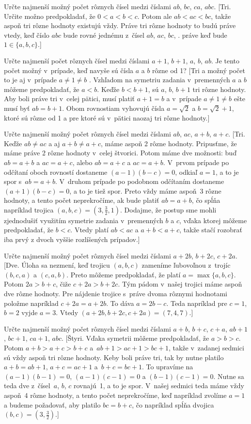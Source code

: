 {Určte najmenší možný počet rôznych čísel medzi
číslami $ab$, $bc$, $ca$, $abc$.
[Tri. Určite možno predpokladať, že
$0<a<b<c$. Potom ale $ab<ac<bc$, takže aspoň tri rôzne hodnoty
existujú vždy. Práve tri rôzne hodnoty to budú
práve vtedy, keď číslo $abc$ bude rovné jednému z~čísel $ab$, $ac$,
$bc$, \tj. práve keď bude $1\in\{a,b,c\}$.]

Určte najmenší počet rôznych čísel medzi číslami $a+1$, $b+1$,
$a$, $b$, $ab$. Je tento počet možný v~prípade, keď navyše
sú čísla $a$ a $b$ rôzne od 1?
[Tri a možný počet to je aj v~prípade $a\ne1\ne b$ .
Vzhľadom na symetriu zadania v~premenných $a$ a $b$ môžeme
predpokladať, že $a<b$. Keďže $b<b+1$, sú $a$, $b$, $b+1$
tri rôzne hodnoty. Aby boli práve tri v~celej pätici, musí platiť
$a+1=b$ a v~prípade $a\ne1\ne b$ ešte musí byť
$ab=b+1$. Obom rovnostiam vyhovujú čísla $a=\sqrt2$ a
$b=\sqrt2+1$, ktoré sú rôzne od 1 a pre ktoré sú v~pätici
naozaj tri rôzne hodnoty.]

Určte najmenší možný počet rôznych čísel medzi
číslami $ab$, $ac$, $a+b$, $a+c$.
[Tri. Keďže $ab \ne ac$ a aj $a+b\ne a+c$, máme aspoň 2
rôzne hodnoty. Pripusťme, že máme práve 2 rôzne hodnoty
v~celej štvorici. Potom máme dve možnosti: buď $ab=a+b$ a $ac=a+c$,
alebo $ab=a+c$ a $ac=a+b$. V~prvom prípade po odčítaní oboch rovností
dostaneme $(a-1)(b-c)=0$, odkiaľ $a=1$, a to je spor s~$ab=a+b$.
V~druhom prípade po podobnom odčítaním dostaneme $(a+1)(b-c)=0$,
a to je tiež spor. Preto vždy máme aspoň~3 rôzne hodnoty, a
tento počet neprekročíme, ak bude platiť $ab=a+b$, čo spĺňa
napríklad trojica $(a,b,c)=(3,\frac32,1)$. Dodajme, že postup
sme mohli zjednodušiť využitím symetrie zadania v~premenných
$b$ a $c$, vďaka ktorej môžeme predpokladať, že $b<c$. Vtedy platí
$ab<ac$ a $a+b<a+c$, takže stačí rozobrať iba prvý z dvoch vyššie
rozlíšených prípadov.]

\D
Určte najmenší možný počet rôznych čísel medzi
číslami $a+2b$, $b+2c$, $c+2a$.
[Dve. Úloha sa nezmení, keď trojicu $(a,b,c)$ zameníme ľubovoľnou
z~trojíc $(b,c,a)$ a $(c,a,b)$. Preto môžeme predpokladať,
že platí $a=\max\{a,b,c\}$. Potom $2a>b+c$, čiže $c+2a>b+2c$.
Tým pádom v~našej trojici máme aspoň dve rôzne hodnoty. Pre
nájdenie trojice s~práve dvoma rôznymi hodnotami
položme napríklad $c+2a=a+2b$. To dáva $a=2b-c$. Teda napríklad
pre $c=1$, $b=2$ vyjde $a=3$. Vtedy $(a+2b,b+2c,c+2a)=(7,4,7)$.]

Určte najmenší možný počet rôznych čísel medzi
číslami $a+b$, $b+c$, $c+a$, $ab+1$, $bc+1$, $ca+1$, $abc$.
[Štyri. Vďaka symetrii môžeme predpokladať, že $a>b>c$.
Potom $a+b>a+c>b+c$ a~$ab+1>ac+1>bc+1$, takže v~zadanej sedmici
sú vždy aspoň tri rôzne hodnoty. Keby boli práve tri, tak by
nutne platilo $a+b=ab+1$, $a+c=ac+1$ a~$b+c=bc+1$. To upravíme na
$(a-1)(b-1)=0$, $(a-1)(c-1)=0$ a $(b-1)(c-1)=0$. Nutne sa teda
dve z~čísel~$a$, $b$, $c$ rovnajú~1, a to je spor. V~našej sedmici
teda máme vždy aspoň~4 rôzne hodnoty, a tento počet neprekročíme, keď
napríklad zvolíme $a=1$ a budeme požadovať, aby platilo $bc=b+c$,
čo napríklad spĺňa dvojica $(b,c)=\left(3,\frac32\right)$.]

}

